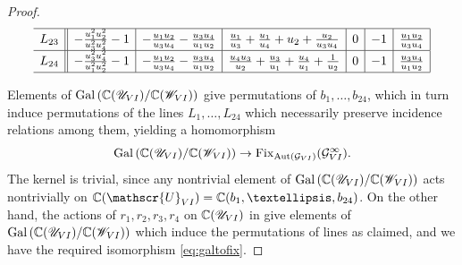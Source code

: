 \documentclass[10pt,a4paper]{amsart}
\newcommand{\C}{\mathbb{C}}
\newcommand{\pain}[1]{\operatorname{P}_{\mathrm{#1}}}
\begin{document}
\begin{proof}
\begin{table}[h]
\begin{equation*}
\begin{array}{c||c|c|c|c|c|c|}
        \hline
        L_{23}  & -\frac{u_1^2 u_2^2}{u_3^2 u_4^2}-1 & -\frac{u_1 u_2}{u_3 u_4}-\frac{u_3 u_4}{u_1 u_2} & \frac{u_1}{u_3}+\frac{u_1}{u_4}+u_2+\frac{u_2}{u_3 u_4}  & 0 & -1   & \frac{u_1 u_2}{u_3 u_4}          \\
        \hline
        L_{24}  & -\frac{u_3^2 u_4^2}{u_1^2 u_2^2}-1  & -\frac{u_1 u_2}{u_3 u_4}-\frac{u_3 u_4}{u_1 u_2} & \frac{u_4 u_3}{u_2}+\frac{u_3}{u_1}+\frac{u_4}{u_1}+\frac{1}{u_2} & 0 & -1   & \frac{u_3 u_4}{u_1 u_2}          \\
        \hline
    \end{array}
    \end{equation*}
    \caption{Pl\"ucker coordinates of lines $L_1,\dots,L_{24}$ on the monodromy surface for $\pain{VI}$}
    \label{tab:PVI:plucker:1to24}
\end{table}
\endgroup



Elements of $\operatorname{Gal}\left(\C(\mathscr{U}_{\rm{VI}})/\C(\mathscr{W}_{\rm{VI}})\right)$ give permutations of $b_1,\dots,b_{24}$, which in turn induce permutations of the lines $L_1,\dots,L_{24}$ which necessarily preserve incidence relations among them, yielding a homomorphism 
\begin{equation} \label{eq:galtofix}
\operatorname{Gal}\left(\C(\mathscr{U}_{\rm{VI}})/\C(\mathscr{W}_{\rm{VI}})\right)\rightarrow \operatorname{Fix}_{\operatorname{Aut}(\mathcal{G}_{\rm{VI}})}(\mathcal{G}_{\rm{VI}}^\infty).
\end{equation}
The kernel is trivial, since any nontrivial element of $\operatorname{Gal}\left(\C(\mathscr{U}_{\rm{VI}})/\C(\mathscr{W}_{\rm{VI}})\right)$ acts nontrivially on $\mathbb{C}(\mathscr{U}_{\rm{VI}})=\C(b_1,\dots,b_{24})$. 
On the other hand, the actions of $r_1,r_2,r_3,r_4$ on $\C(\mathscr{U}_{\rm{VI}})$ in  give elements of $\operatorname{Gal}\left(\C(\mathscr{U}_{\rm{VI}})/\C(\mathscr{W}_{\rm{VI}})\right)$
which induce the permutations of lines as claimed, and we have the required isomorphism \eqref{eq:galtofix}.
\end{proof}
\end{document}
